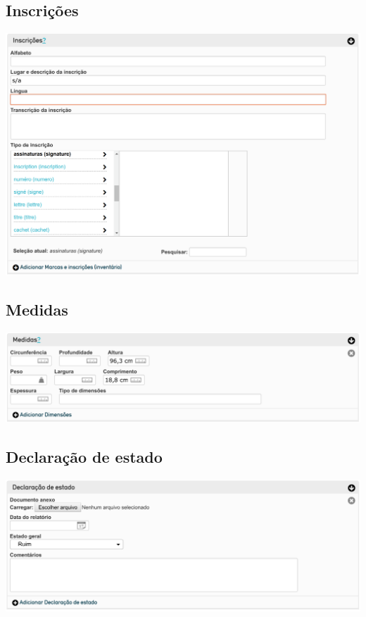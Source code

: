 \subsection{Inscrições}
\begin{flushleft}
	\includegraphics[width=\linewidth]{elemento-11}
\end{flushleft}

\subsection{Medidas}
\begin{flushleft}
	\includegraphics[width=\linewidth]{elemento-12}
\end{flushleft}

\subsection{Declaração de estado}
\begin{flushleft}
	\includegraphics[width=\linewidth]{elemento-13}
\end{flushleft}

